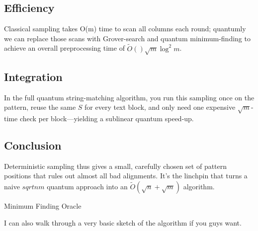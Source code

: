 \documentclass[11pt]{article}
\begin{document}
\subsection*{Efficiency}
Classical sampling takes O(m) time to scan all columns each round; quantumly we can replace those scans with Grover-search and quantum minimum-finding to achieve an overall preprocessing time of \(\widetilde{O}()\sqrt{m} \log^2 m\).

\subsection*{Integration}
In the full quantum string-matching algorithm, you run this sampling once on the pattern, reuse the same \(S\) for every text block, and only need one expensive \(\sqrt{m}\)-time check per block—yielding a sublinear quantum speed-up.

\subsection*{Conclusion}
Deterministic sampling thus gives a small, carefully chosen set of pattern positions that rules out almost all bad alignments. It's the linchpin that turns a naive \(sqrt{nm}\) quantum approach into an \(\widetilde{O}(\sqrt{n} + \sqrt{m})\) algorithm.

Minimum Finding Oracle

I can also walk through a very basic sketch of the algorithm if you guys want.
\end{document}
